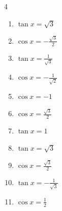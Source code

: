 \begin{multicols}{4}
\begin{enumerate}

\columnbreak %

  \item $\displaystyle \tan{x}  = \sqrt{3}$


  \item $\displaystyle \cos{x}  = -\frac{\sqrt{3}}{2}$


  \item $\displaystyle \tan{x}  = \frac{1}{\sqrt{3}}$


  \item $\displaystyle \cos{x}  = -\frac{1}{\sqrt{2}}$


  \item $\displaystyle \cos{x}  = -1$


  \item $\displaystyle \cos{x}  = \frac{\sqrt{3}}{2}$


  \item $\displaystyle \tan{x}  = 1$


  \item $\displaystyle \tan{x}  = \sqrt{3}$


  \item $\displaystyle \cos{x}  = \frac{\sqrt{3}}{2}$


  \item $\displaystyle \tan{x}  = -\frac{1}{\sqrt{3}}$


  \item $\displaystyle \cos{x}  = \frac{1}{2}$


\end{enumerate}
\end{multicols}

